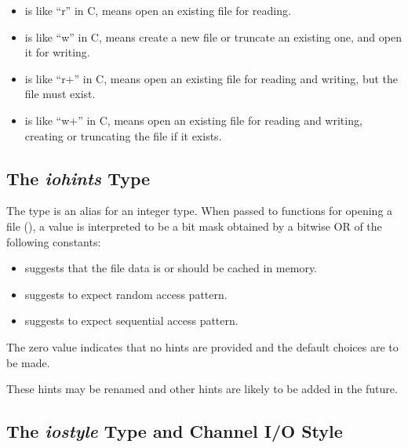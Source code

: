 \begin{itemize}

\item {} is like ``r'' in C, means open an existing file for reading.

\item {} is like ``w'' in C, means create a new file or
      truncate an existing one, and open it for writing.

\item {} is like ``r+'' in C, means open an existing file for reading
      and writing, but the file must exist.

\item {} is like ``w+'' in C, means open an existing file for reading
      and writing, creating or truncating the file if it exists.

\end{itemize}


\subsection{The {\em iohints} Type}
\label{IO_iohints_type}

The  type is an alias for an integer type.
When passed to functions for opening a file (),
a  value is interpreted to be a bit mask obtained
by a bitwise OR of the following constants:

\begin{itemize}

\item {} suggests that the file data is or should be
      cached in memory.

\item {} suggests to expect random access pattern.

\item {} suggests to expect sequential access pattern.

\end{itemize}

The zero value indicates that no hints are provided and the default
choices are to be made.

\begin{future}
These hints may be renamed and other hints are likely to be added
in the future.
\end{future}


\subsection{The {\em iostyle} Type and Channel I/O Style}
\label{IO_iostyle_type}
\label{IO_io_style}

